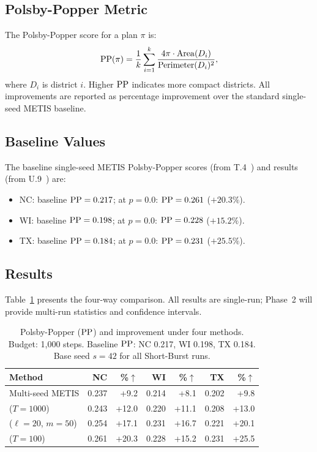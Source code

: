 \subsection{Polsby-Popper Metric}

The Polsby-Popper score for a plan $\pi$ is:
\[
  \mathrm{PP}(\pi) = \frac{1}{k} \sum_{i=1}^k \frac{4\pi \cdot \mathrm{Area}(D_i)}{\mathrm{Perimeter}(D_i)^2},
\]
where $D_i$ is district $i$.
Higher $\mathrm{PP}$ indicates more compact districts.
All improvements are reported as percentage improvement over the
standard single-seed METIS baseline.

\subsection{Baseline Values}

The baseline single-seed METIS Polsby-Popper scores (from T.4~\citep{b11paper})
and \be{} results (from U.9~\citep{h1paper}) are:
\begin{itemize}
\item NC: baseline $\mathrm{PP} = 0.217$; \be{} at $p = 0.0$: $\mathrm{PP} = 0.261$
      ($+20.3\%$).
\item WI: baseline $\mathrm{PP} = 0.198$; \be{} at $p = 0.0$: $\mathrm{PP} = 0.228$
      ($+15.2\%$).
\item TX: baseline $\mathrm{PP} = 0.184$; \be{} at $p = 0.0$: $\mathrm{PP} = 0.231$
      ($+25.5\%$).
\end{itemize}

\subsection{Results}

Table~\ref{tab:comparison} presents the four-way comparison.
All results are single-run; Phase~2 will provide multi-run statistics
and confidence intervals.

\begin{table}[h]
\centering
\footnotesize
\setlength{\tabcolsep}{5pt}
\caption{Polsby-Popper ($\mathrm{PP}$) and improvement under four methods.
         Budget: 1{,}000 \recom{} steps.
         Baseline $\mathrm{PP}$: NC 0.217, WI 0.198, TX 0.184.
         Base seed $s = 42$ for all Short-Burst runs.}
\label{tab:comparison}
\begin{tabular}{lrrrrrr}
\toprule
Method & NC & \%$\uparrow$ & WI & \%$\uparrow$ & TX & \%$\uparrow$ \\
\midrule
Multi-seed METIS           & 0.237 & +9.2  & 0.214 & +8.1  & 0.202 & +9.8  \\
\cs{} ($T=1000$)           & 0.243 & +12.0 & 0.220 & +11.1 & 0.208 & +13.0 \\
\shb{} ($\ell=20$, $m=50$) & 0.254 & +17.1 & 0.231 & +16.7 & 0.221 & +20.1 \\
\be{} ($T=100$)            & 0.261 & +20.3 & 0.228 & +15.2 & 0.231 & +25.5 \\
\bottomrule
\end{tabular}
\end{table}

